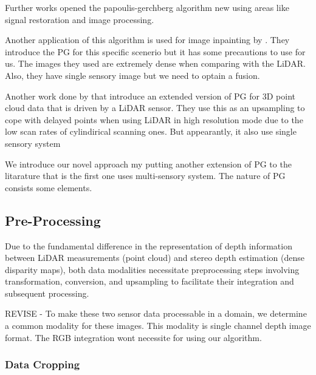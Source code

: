 \documentclass[conference]{IEEEtran}
\begin{document}
Further works opened the papoulis-gerchberg algorithm new using areas like signal restoration and image processing.

Another application of this algorithm is used for image inpainting by \cite{pg-image-inpaint-2009}. They introduce the PG for this specific scenerio but it has some precautions to use for us. The images they used are extremely dense when comparing with the LiDAR. Also, they have single sensory image but we need to optain a fusion. 

Another work done by \cite{ozbay2015high} that introduce an extended version of PG for 3D point cloud data that is driven by a LiDAR sensor. They use this as an upsampling to cope with delayed points when using LiDAR in high resolution mode due to the low scan rates of cylindirical scanning ones. But appearantly, it also use single sensory system

We introduce our novel approach my putting another extension of PG to the litarature that is the first one uses multi-sensory system. The nature of PG consists some elements. 

\subsection{Pre-Processing}

Due to the fundamental difference in the representation of depth information between LiDAR measurements (point cloud) and stereo depth estimation (dense disparity maps), both data modalities necessitate preprocessing steps involving transformation, conversion, and upsampling to facilitate their integration and subsequent processing.

REVISE - To make these two sensor data processable in a domain, we determine a common modality for these images. This modality is single channel depth image format. The RGB integration wont necessite for using our algorithm.

\subsubsection{Data Cropping}
\end{document}

